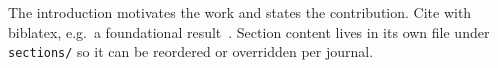 The introduction motivates the work and states the contribution. Cite with biblatex,
e.g.\ a foundational result~\autocite{example2025}. Section content lives in its own
file under \texttt{sections/} so it can be reordered or overridden per journal.
